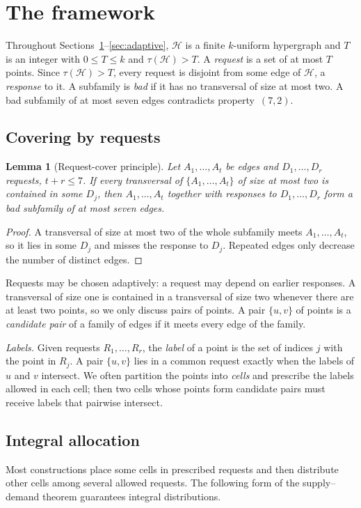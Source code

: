 \documentclass[11pt]{article}
\numberwithin{equation}{section}
\newtheorem{lemma}[theorem]{Lemma}
\theoremstyle{definition}
\theoremstyle{remark}
\newcommand{\HH}{\mathcal H}
\begin{document}
\section{The framework}\label{sec:framework}

Throughout Sections~\ref{sec:framework}--\ref{sec:adaptive}, $\HH$ is a
finite $k$-uniform hypergraph and $T$ is an integer with $0\le T\le k$
and $\tau(\HH)>T$. A \emph{request} is a set of at most $T$ points. Since
$\tau(\HH)>T$, every request is disjoint from some edge of $\HH$, a
\emph{response} to it. A subfamily is \emph{bad} if it has no
transversal of size at most two. A bad subfamily of at most seven edges
contradicts property~$(7,2)$.

\subsection{Covering by requests}
\begin{lemma}[Request-cover principle]\label{lem:requestcover}
Let $A_1,\dots,A_t$ be edges and $D_1,\dots,D_r$ requests, $t+r\le7$.
If every transversal of $\{A_1,\dots,A_t\}$ of size at most two is
contained in some $D_j$, then $A_1,\dots,A_t$ together with responses
to $D_1,\dots,D_r$ form a bad subfamily of at most seven edges.
\end{lemma}
\begin{proof}
A transversal of size at most two of the whole subfamily meets
$A_1,\dots,A_t$, so it lies in some $D_j$ and misses the response to
$D_j$. Repeated edges only decrease the number of distinct edges.
\end{proof}

Requests may be chosen adaptively: a request may depend on earlier
responses. A transversal of size one is contained in a transversal of
size two whenever there are at least two points, so we only discuss
pairs of points. A pair $\{u,v\}$ of points is a \emph{candidate pair}
of a family of edges if it meets every edge of the family.

\emph{Labels.} Given requests $R_1,\dots,R_r$, the \emph{label} of a
point is the set of indices $j$ with the point in $R_j$. A pair $\{u,v\}$
lies in a common request exactly when the labels of $u$ and $v$
intersect. We often partition the points into \emph{cells} and
prescribe the labels allowed in each cell; then two cells whose points
form candidate pairs must receive labels that pairwise intersect.

\subsection{Integral allocation}
Most constructions place some cells in prescribed requests and then
distribute other cells among several allowed requests. The following
form of the supply--demand theorem guarantees integral distributions.
\end{document}
